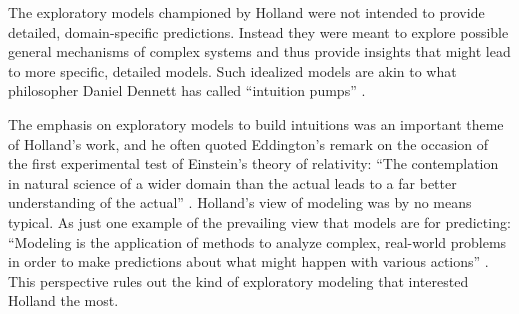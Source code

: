 \documentclass{sig-alternate}
\begin{document}

The exploratory models championed by Holland were not intended to
provide detailed, domain-specific predictions.  Instead they were
meant to explore possible general mechanisms of complex systems and
thus provide insights that might lead to more specific, detailed
models.  Such idealized models are akin to what philosopher Daniel Dennett has called
``intuition pumps'' \cite{Dennett1984}.

The emphasis on exploratory models to build intuitions was an
important theme of Holland's work, and he often quoted Eddington's
remark on the occasion of the first experimental test of Einstein's
theory of relativity: ``The contemplation in natural science of a wider
domain than the actual leads to a far better understanding of the
actual'' \cite{Eddington1927}.
Holland's view of modeling was by no means
typical.  As just one example of the prevailing view that models are
for predicting: 
``Modeling is the application
of methods to analyze complex, real-world problems in order to make
predictions about what might happen with various actions''
\cite{Shiflet2014}.   This perspective rules out the
kind of exploratory modeling that interested Holland the most. 



\end{document}
